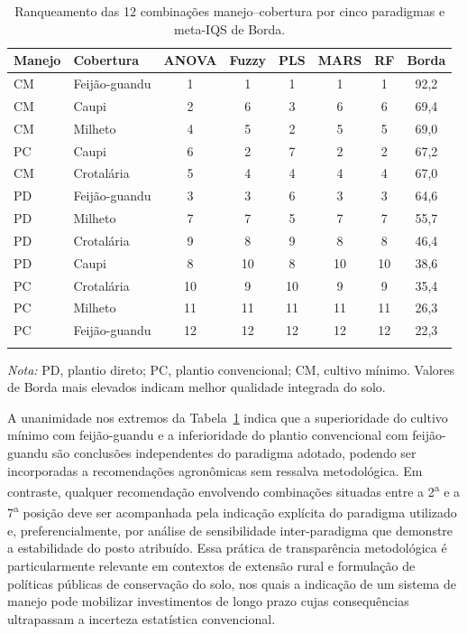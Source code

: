 \documentclass[pdflatex,sn-basic]{sn-jnl}%
\begin{document}
\begin{table}[ht]
\caption{Ranqueamento das 12 combinações manejo--cobertura por cinco paradigmas e meta-IQS de Borda.}\label{tab:ranking}
\begin{tabular*}{\textwidth}{@{\extracolsep\fill}llcccccc}
\toprule
Manejo & Cobertura & ANOVA & Fuzzy & PLS & MARS & RF & Borda \\
\midrule
CM & Feijão-guandu & 1 & 1 & 1 & 1 & 1 & 92,2 \\
CM & Caupi         & 2 & 6 & 3 & 6 & 6 & 69,4 \\
CM & Milheto       & 4 & 5 & 2 & 5 & 5 & 69,0 \\
PC & Caupi         & 6 & 2 & 7 & 2 & 2 & 67,2 \\
CM & Crotalária    & 5 & 4 & 4 & 4 & 4 & 67,0 \\
PD & Feijão-guandu & 3 & 3 & 6 & 3 & 3 & 64,6 \\
PD & Milheto       & 7 & 7 & 5 & 7 & 7 & 55,7 \\
PD & Crotalária    & 9 & 8 & 9 & 8 & 8 & 46,4 \\
PD & Caupi         & 8 &10 & 8 &10 &10 & 38,6 \\
PC & Crotalária    &10 & 9 &10 & 9 & 9 & 35,4 \\
PC & Milheto       &11 &11 &11 &11 &11 & 26,3 \\
PC & Feijão-guandu &12 &12 &12 &12 &12 & 22,3 \\
\botrule
\end{tabular*}
\smallskip\noindent\textit{Nota:} PD, plantio direto; PC, plantio convencional; CM, cultivo mínimo. Valores de Borda mais elevados indicam melhor qualidade integrada do solo.
\end{table}

A unanimidade nos extremos da Tabela~\ref{tab:ranking} indica que a superioridade do cultivo mínimo com feijão-guandu e a inferioridade do plantio convencional com feijão-guandu são conclusões independentes do paradigma adotado, podendo ser incorporadas a recomendações agronômicas sem ressalva metodológica. Em contraste, qualquer recomendação envolvendo combinações situadas entre a 2\textsuperscript{a} e a 7\textsuperscript{a} posição deve ser acompanhada pela indicação explícita do paradigma utilizado e, preferencialmente, por análise de sensibilidade inter-paradigma que demonstre a estabilidade do posto atribuído. Essa prática de transparência metodológica é particularmente relevante em contextos de extensão rural e formulação de políticas públicas de conservação do solo, nos quais a indicação de um sistema de manejo pode mobilizar investimentos de longo prazo cujas consequências ultrapassam a incerteza estatística convencional.
\end{document}
